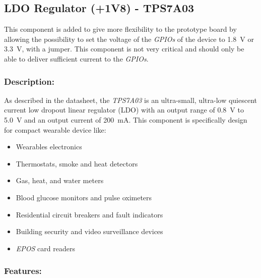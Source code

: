 \documentclass[report.tex]{subfiles}
\begin{document}

\subsection{LDO Regulator (+1V8) - TPS7A03}
This component is added to give more flexibility to the prototype board by allowing the possibility to set the voltage of the \textit{GPIOs} of the device to \SI{1.8}{\volt} or \SI{3.3}{\volt}, with a jumper. This component is not very critical and should only be able to deliver sufficient current to the \textit{GPIOs}.

\subsubsection{Description:}

As described in the datasheet, the \textit{TPS7A03}\cite{TPS7A03} is an ultra-small, ultra-low quiescent current low dropout linear regulator (LDO) with an output range of \SI{0.8}{\volt} to \SI{5.0}{\volt} and an output current of \SI{200}{\milli\ampere}. This component is specifically design for compact wearable device like:
\begin{itemize}
\item Wearables electronics
\item Thermostats, smoke and heat detectors
\item Gas, heat, and water meters
\item Blood glucose monitors and pulse oximeters
\item Residential circuit breakers and fault indicators
\item Building security and video surveillance devices
\item \textit{EPOS} card readers
\end{itemize}

\subsubsection{Features:}
\end{document}
